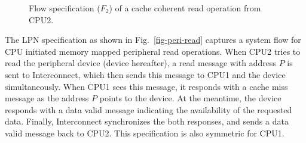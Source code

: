 \documentclass[conference]{IEEEtran}
\begin{document}
\begin{figure}[htbp]
\begin{center}
{
}
\caption{Flow specification ($F_2$) of a cache coherent read operation from CPU2.}
\label{fig-cpu-read}
\end{center}
\end{figure}


The LPN specification as shown in Fig.~\ref{fig-peri-read} captures a system flow for CPU initiated memory mapped peripheral read operations.  When CPU2 tries to read the peripheral device (device hereafter), a read message with address $P$ is sent to Interconnect, which then sends this message to CPU1 and the device simultaneously.  When CPU1 sees this message, it responds with a cache miss message as the address $P$ points to the device.  At the meantime, the device responds with a data valid message indicating the availability of the requested data.  Finally, Interconnect synchronizes the both responses, and sends a data valid message back to CPU2.   This specification is also symmetric for CPU1.
\end{document}
